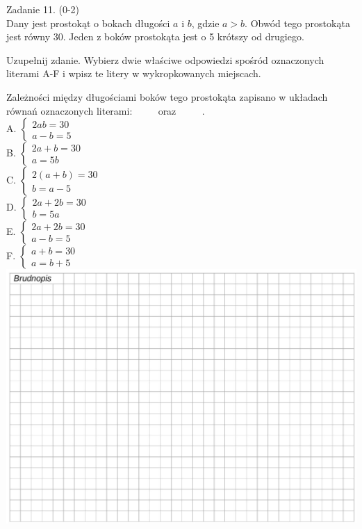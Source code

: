 \documentclass[10pt]{article}
\begin{document}
Zadanie 11. (0-2)\\
Dany jest prostokąt o bokach długości \(a\) i \(b\), gdzie \(a>b\). Obwód tego prostokąta jest równy 30. Jeden z boków prostokąta jest o 5 krótszy od drugiego.

Uzupełnij zdanie. Wybierz dwie właściwe odpowiedzi spośród oznaczonych literami A-F i wpisz te litery w wykropkowanych miejscach.

Zależności między długościami boków tego prostokąta zapisano w układach równań oznaczonych literami: \(\qquad\) oraz \(\qquad\) .\\
A. \(\left\{\begin{array}{l}2 a b=30 \\ a-b=5\end{array}\right.\)\\
B. \(\left\{\begin{array}{l}2 a+b=30 \\ a=5 b\end{array}\right.\)\\
C. \(\left\{\begin{array}{l}2(a+b)=30 \\ b=a-5\end{array}\right.\)\\
D. \(\left\{\begin{array}{l}2 a+2 b=30 \\ b=5 a\end{array}\right.\)\\
E. \(\left\{\begin{array}{l}2 a+2 b=30 \\ a-b=5\end{array}\right.\)\\
F. \(\left\{\begin{array}{l}a+b=30 \\ a=b+5\end{array}\right.\)\\
\includegraphics[max width=\textwidth, center]{2024_11_21_51cb67544fb9b029f01cg-11}
\end{document}
